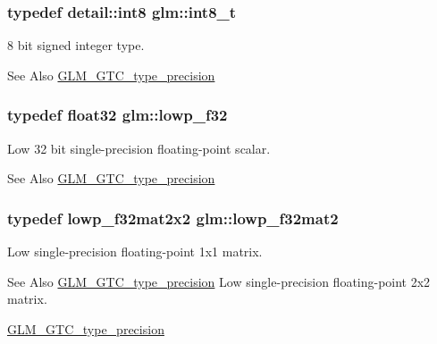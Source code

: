 \hypertarget{group__gtc__type__precision_ga673898d450b2a91186f3c4f40c5f8633}{
\subsubsection[{int8\-\_\-t}]{\setlength{\rightskip}{0pt plus 5cm}typedef detail\-::int8 {\bf glm\-::int8\-\_\-t}}}\label{group__gtc__type__precision_ga673898d450b2a91186f3c4f40c5f8633}
8 bit signed integer type. \begin{DoxySeeAlso}{See Also}
\hyperlink{group__gtc__type__precision}{G\-L\-M\-\_\-\-G\-T\-C\-\_\-type\-\_\-precision} 
\end{DoxySeeAlso}
\hypertarget{group__gtc__type__precision_ga1b9734de4b4429dc26b1454a2a399b05}{
\subsubsection[{lowp\-\_\-f32}]{\setlength{\rightskip}{0pt plus 5cm}typedef float32 {\bf glm\-::lowp\-\_\-f32}}}\label{group__gtc__type__precision_ga1b9734de4b4429dc26b1454a2a399b05}
Low 32 bit single-\/precision floating-\/point scalar. \begin{DoxySeeAlso}{See Also}
\hyperlink{group__gtc__type__precision}{G\-L\-M\-\_\-\-G\-T\-C\-\_\-type\-\_\-precision} 
\end{DoxySeeAlso}
\hypertarget{group__gtc__type__precision_gad717448ef1129d7b795ebcfee6c4944c}{
\subsubsection[{lowp\-\_\-f32mat2}]{\setlength{\rightskip}{0pt plus 5cm}typedef lowp\-\_\-f32mat2x2 {\bf glm\-::lowp\-\_\-f32mat2}}}\label{group__gtc__type__precision_gad717448ef1129d7b795ebcfee6c4944c}
Low single-\/precision floating-\/point 1x1 matrix. \begin{DoxySeeAlso}{See Also}
\hyperlink{group__gtc__type__precision}{G\-L\-M\-\_\-\-G\-T\-C\-\_\-type\-\_\-precision} Low single-\/precision floating-\/point 2x2 matrix. 

\hyperlink{group__gtc__type__precision}{G\-L\-M\-\_\-\-G\-T\-C\-\_\-type\-\_\-precision} 
\end{DoxySeeAlso}

